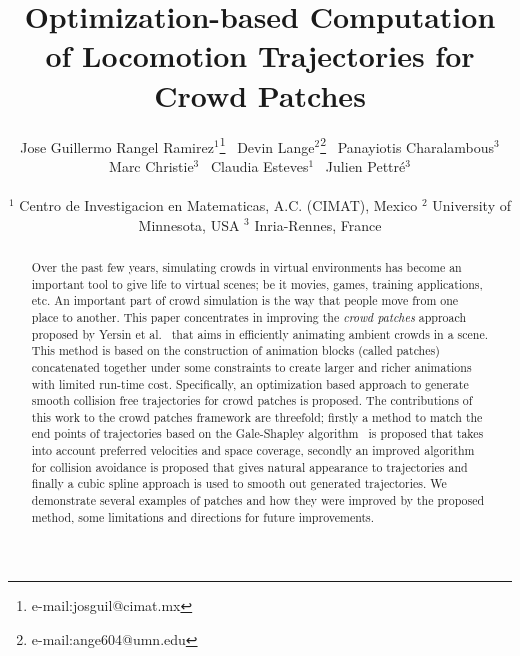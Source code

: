 \documentclass[conference]{acmsiggraph}
\title{Optimization-based Computation of Locomotion Trajectories for Crowd Patches}
\author{
	Jose Guillermo Rangel Ramirez{$^1$}\thanks{e-mail:josguil@cimat.mx}~
	Devin Lange{$^2$}\thanks{e-mail:ange604@umn.edu}~
	Panayiotis Charalambous{$^3$}\\
	Marc Christie{$^3$}~
	Claudia Esteves{$^1$}~
	Julien Pettr\'e{$^3$}
	\\\\
	$^1$ Centro de Investigacion en Matematicas, A.C. (CIMAT), Mexico
	$^2$ University of Minnesota, USA
	$^3$ Inria-Rennes, France
}
\newcommand{\etal}{et al.\xspace}
\begin{document}

\maketitle

\begin{abstract}

Over the past few years, simulating crowds in virtual environments has become an important tool to give life to virtual scenes; be it movies, games, training applications, etc.
An important part of crowd simulation is the way that people
move from one place to another.
This paper concentrates in improving the \emph{crowd patches} approach proposed by Yersin \etal~\cite{Yersin:2009} that aims in efficiently animating ambient crowds in a scene.
This method is based on the construction of animation blocks (called patches) concatenated together under some constraints to create larger and richer animations with limited run-time cost.
Specifically, an optimization based approach to generate smooth collision free trajectories for crowd patches is proposed.
The contributions of this work to the crowd patches framework are threefold; firstly a method to match the end points of trajectories based on the Gale-Shapley algorithm~\cite{gale1962college} is proposed that takes into account preferred velocities and space coverage, secondly an improved algorithm for collision avoidance is proposed that gives natural appearance to trajectories and finally a cubic spline approach is used to smooth out generated trajectories.
We demonstrate several examples of patches and how they were improved by the proposed method, some limitations and directions for future improvements.

\end{abstract}
\end{document}
